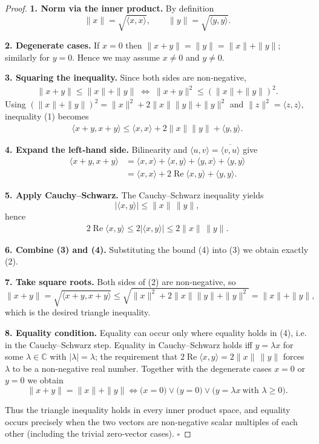 \begin{proof}
\textbf{1. Norm via the inner product.}  
By definition  
\[
\|x\|=\sqrt{\langle x,x\rangle},\qquad 
\|y\|=\sqrt{\langle y,y\rangle}.
\]

\textbf{2. Degenerate cases.}  
If \(x=0\) then \(\|x+y\|=\|y\|=\|x\|+\|y\|\); similarly for \(y=0\).  
Hence we may assume \(x\neq0\) and \(y\neq0\).

\textbf{3. Squaring the inequality.}  
Since both sides are non‑negative,
\begin{align}
\|x+y\|\le\|x\|+\|y\|
\;\Longleftrightarrow\;
\|x+y\|^{2}\le(\|x\|+\|y\|)^{2}. \tag{1}
\end{align}
Using \((\|x\|+\|y\|)^{2}= \|x\|^{2}+2\|x\|\|y\|+\|y\|^{2}\) and \(\|z\|^{2}=\langle z,z\rangle\), inequality (1) becomes
\begin{align}
\langle x+y,x+y\rangle\le 
\langle x,x\rangle+2\|x\|\|y\|+\langle y,y\rangle .
\tag{2}
\end{align}

\textbf{4. Expand the left‑hand side.}  
Bilinearity and \(\langle u,v\rangle=\overline{\langle v,u\rangle}\) give
\begin{align}
\langle x+y,x+y\rangle
&=\langle x,x\rangle+\langle x,y\rangle+\langle y,x\rangle+\langle y,y\rangle \\
&=\langle x,x\rangle+2\operatorname{Re}\langle x,y\rangle+\langle y,y\rangle .
\tag{3}
\end{align}

\textbf{5. Apply Cauchy–Schwarz.}  
The Cauchy–Schwarz inequality yields
\[
|\langle x,y\rangle|\le\|x\|\,\|y\|,
\]
hence
\begin{align}
2\operatorname{Re}\langle x,y\rangle
\le 2|\langle x,y\rangle|
\le 2\|x\|\,\|y\|.
\tag{4}
\end{align}

\textbf{6. Combine (3) and (4).}  
Substituting the bound (4) into (3) we obtain exactly (2).

\textbf{7. Take square roots.}  
Both sides of (2) are non‑negative, so
\[
\|x+y\|
=\sqrt{\langle x+y,x+y\rangle}
\le\sqrt{\|x\|^{2}+2\|x\|\|y\|+\|y\|^{2}}
=\|x\|+\|y\|,
\]
which is the desired triangle inequality.

\textbf{8. Equality condition.}  
Equality can occur only where equality holds in (4), i.e. in the
Cauchy–Schwarz step.  Equality in Cauchy–Schwarz holds iff
\(y=\lambda x\) for some \(\lambda\in\mathbb{C}\) with
\(|\lambda|=\lambda\); the requirement that
\(2\operatorname{Re}\langle x,y\rangle=2\|x\|\,\|y\|\) forces \(\lambda\) to be a
non‑negative real number.  Together with the degenerate cases \(x=0\) or
\(y=0\) we obtain
\[
\|x+y\|=\|x\|+\|y\|
\iff
\bigl(x=0\bigr)\lor\bigl(y=0\bigr)\lor\bigl(y=\lambda x\ \text{with }\lambda\ge0\bigr).
\]

Thus the triangle inequality holds in every inner product space, and equality
occurs precisely when the two vectors are non‑negative scalar multiples of each
other (including the trivial zero‑vector cases). \(\square\)
\end{proof}